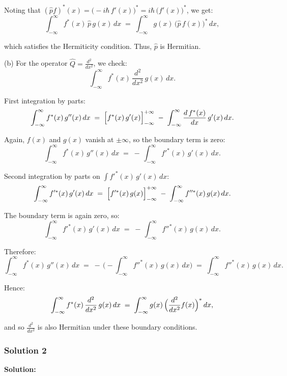 \documentclass{article}
\begin{document}
Noting that \((\hat{p}f)^*(x) = \bigl(-i\hbar\,f'(x)\bigr)^* = i\hbar\,\bigl(f'(x)\bigr)^*\), we get:
\[
\int_{-\infty}^{\infty} f^*(x)\,\hat{p}\,g(x)\,dx
\;=\;
\int_{-\infty}^{\infty} g(x)\,\bigl(\hat{p}\,f(x)\bigr)^*\,dx,
\]

which satisfies the Hermiticity condition. Thus, \(\hat{p}\) is Hermitian.

(b) For the operator \(\hat{Q} = \frac{d^2}{dx^2}\), we check:
\[
\int_{-\infty}^{\infty} f^*(x)\,\frac{d^2}{dx^2}\,g(x)\,dx.
\]

First integration by parts:
\[
\int_{-\infty}^{\infty} f^*(x)\,g''(x)\,dx
\;=\;
\Bigl[f^*(x)\,g'(x)\Bigr]_{-\infty}^{+\infty}
\;-\;
\int_{-\infty}^{\infty} \frac{d\,f^*(x)}{dx}\,g'(x)\,dx.
\]

Again, \(f(x)\) and \(g(x)\) vanish at \(\pm\infty\), so the boundary term is zero:
\[
\int_{-\infty}^{\infty} f^*(x)\,g''(x)\,dx
\;=\;
-\,\int_{-\infty}^{\infty} f'^*(x)\,g'(x)\,dx.
\]

Second integration by parts on \(\int f'^*(x)\,g'(x)\,dx\):
\[
\int_{-\infty}^{\infty} f'^*(x)\,g'(x)\,dx
\;=\;
\Bigl[f'^*(x)\,g(x)\Bigr]_{-\infty}^{+\infty}
\;-\;
\int_{-\infty}^{\infty} f''^*(x)\,g(x)\,dx.
\]

The boundary term is again zero, so:
\[
\int_{-\infty}^{\infty} f'^*(x)\,g'(x)\,dx
\;=\;
-\,\int_{-\infty}^{\infty} f''^*(x)\,g(x)\,dx.
\]

Therefore:
\[
\int_{-\infty}^{\infty} f^*(x)\,g''(x)\,dx
\;=\;
-\,\bigl(-\int_{-\infty}^{\infty} f''^*(x)\,g(x)\,dx\bigr)
\;=\;
\int_{-\infty}^{\infty} f''^*(x)\,g(x)\,dx.
\]

Hence:
\[
\int_{-\infty}^{\infty} f^*(x)\,\frac{d^2}{dx^2}\,g(x)\,dx
\;=\;
\int_{-\infty}^{\infty} g(x)\,\Bigl(\frac{d^2}{dx^2} f(x)\Bigr)^*\,dx,
\]

and so \(\frac{d^2}{dx^2}\) is also Hermitian under these boundary conditions.


\subsubsection{Solution 2}

\textbf{Solution:}
\end{document}
